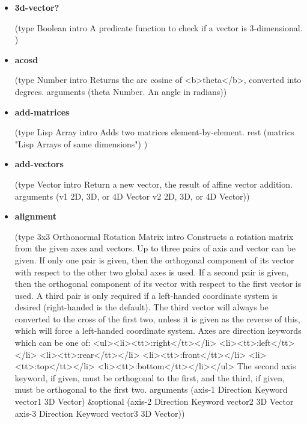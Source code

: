 \documentclass [11pt]{book}
\begin{document}
\begin{itemize}
\item {}
\label{prim:3d-vector?}
\textbf{3d-vector?}

(type Boolean intro
  A predicate function to check if a vector is 3-dimensional.
)



\item {}
\label{prim:acosd}
\textbf{acosd}

(type Number intro
  Returns the arc cosine of <b>theta</b>, converted into degrees.
 arguments (theta Number. An angle in radians))



\item {}
\label{prim:add-matrices}
\textbf{add-matrices}

(type Lisp Array intro  Adds two matrices element-by-element.
 rest (matrics "Lisp Arrays of same dimensions") 
)



\item {}
\label{prim:add-vectors}
\textbf{add-vectors}

(type Vector intro
  Return a new vector, the result of affine vector addition.
 arguments (v1 2D, 3D, or 4D Vector v2 2D, 3D, or 4D Vector))



\item {}
\label{prim:alignment}
\textbf{alignment}

(type 3x3 Orthonormal Rotation Matrix intro  Constructs a rotation
matrix from the given axes and vectors. Up to three
pairs of axis and vector can be given.
If only one pair is given, then the orthogonal component of its vector with respect to
the other two global axes is used.
If a second pair is given, then the orthogonal component of its vector
with respect to the first vector is used.
A third pair is only required if a left-handed coordinate system
is desired (right-handed is the default). The third vector will
always be converted to the cross of the first two, unless it is
given as the reverse of this, which will force a left-handed
coordinate system.
Axes are direction keywords which can be one of:
<ul><li><tt>:right</tt></li>
<li><tt>:left</tt></li>
<li><tt>:rear</tt></li>
<li><tt>:front</tt></li>
<li><tt>:top</tt></li>
<li><tt>:bottom</tt></li></ul>
The second axis keyword, if given, must be orthogonal to the first, and the third,
if given, must be orthogonal to the first two.
 arguments (axis-1 Direction Keyword vector1 3D Vector) \&optional
 (axis-2 Direction Keyword vector2 3D Vector axis-3 Direction Keyword
  vector3 3D Vector))




\end{itemize}
\end{document}
